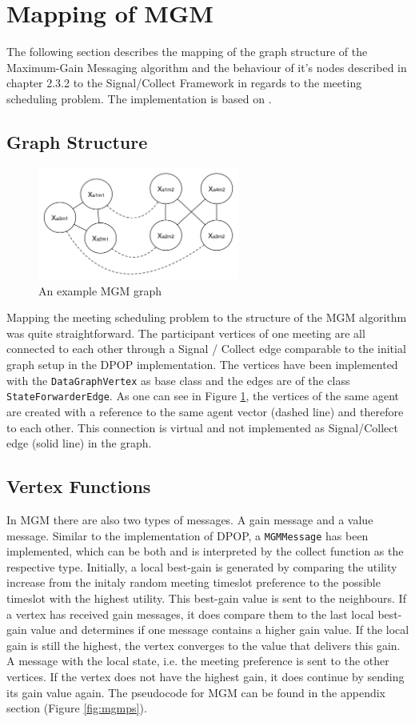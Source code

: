 \section{Mapping of MGM}

The following section describes the mapping of the graph structure of the Maximum-Gain Messaging algorithm and the behaviour of it's nodes described in chapter 2.3.2 to the Signal/Collect Framework in regards to the meeting scheduling problem. The implementation is based on \cite{Chapman2010}.

\subsection{Graph Structure}
\begin{figure}[H]
\includegraphics[width=250px]{graphics/mgm_graph}
\centering
\caption{An example MGM graph}
\label{fig:mgm_graph}
\end{figure}

Mapping the meeting scheduling problem to the structure of the MGM algorithm was quite straightforward. The participant vertices of one meeting are all connected to each other through a Signal / Collect edge comparable to the initial graph setup in the DPOP implementation. The vertices have been implemented with the \texttt{DataGraphVertex} as base class and the edges are of the class \texttt{StateForwarderEdge}. As one can see in Figure \ref{fig:mgm_graph}, the vertices of the same agent are created with a reference to the same agent vector (dashed line) and therefore to each other. This connection is virtual and not implemented as Signal/Collect edge (solid line) in the graph.

\subsection{Vertex Functions}
In MGM there are also two types of messages. A gain message and a value message. Similar to the implementation of DPOP, a \texttt{MGMMessage} has been implemented, which can be both and is interpreted by the collect function as the respective type. Initially, a local best-gain is generated by comparing the utility increase from the initaly random meeting timeslot preference to the possible timeslot with the highest utility. This best-gain value is sent to the neighbours.  If a vertex has received gain messages, it does compare them to the last local best-gain value and determines if one message contains a higher gain value. If the local gain is still the highest, the vertex converges to the value that delivers this gain. A message with the local state, i.e. the meeting preference is sent to the other vertices. If the vertex does not have the highest gain, it does continue by sending its gain value again. The pseudocode for MGM can be found in the appendix section (Figure \ref{fig:mgmps}).

